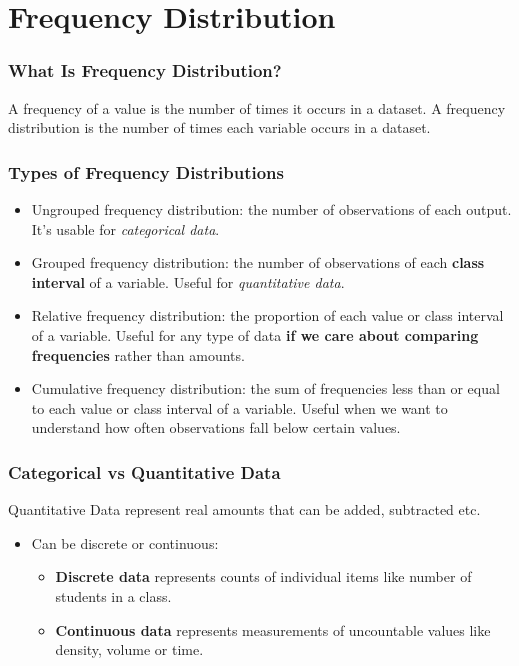 \documentclass[aspectratio=169,11pt,svgnames]{beamer}
\begin{document}
\section{Frequency Distribution}

\begin{frame}
 \frametitle{What Is Frequency Distribution?}
 \begin{tcolorbox}[title=Frequency Distribution]
  A \alert{frequency} of a value is the number of times it occurs in a dataset.
  A \alert{frequency distribution} is the number of times each variable occurs
  in a dataset.
 \end{tcolorbox}
\end{frame}

\begin{frame}
 \frametitle{Types of Frequency Distributions}
 \begin{itemize}[label=\textbullet]
  \item \alert{Ungrouped frequency distribution}: the number of observations of
   each output. It's usable for \emph{categorical data}.
  \pause
  \item \alert{Grouped frequency distribution}: the number of observations of
   each \textbf{class interval} of a variable. Useful for \emph{quantitative
   data}.
  \pause
  \item \alert{Relative frequency distribution}: the proportion of each value or
   class interval of a variable. Useful for any type of data \textbf{if we care
   about comparing frequencies} rather than amounts.
  \pause
  \item \alert{Cumulative frequency distribution}: the sum of frequencies less
   than or equal to each value or class interval of a variable. Useful when we
   want to understand how often observations fall below certain values.
 \end{itemize}
\end{frame}

\begin{frame}
 \frametitle{Categorical vs Quantitative Data}
 \alert{Quantitative Data} represent real amounts that can be added, subtracted
 etc.
 \pause
 \begin{itemize}[label=\textbullet]
  \item Can be discrete or continuous:
  \pause
  \begin{itemize}[label=$\circ$]
   \item \textbf{Discrete data} represents counts of individual items like number of
    students in a class.
   \pause
   \item \textbf{Continuous data} represents measurements of uncountable values like
    density, volume or time.
  \end{itemize}
 \end{itemize}
\end{frame}
\end{document}
